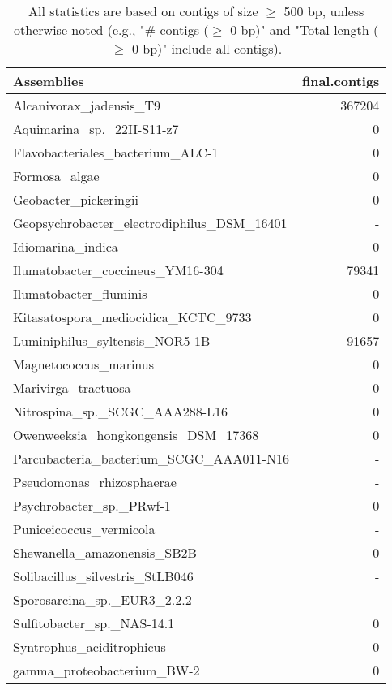 \documentclass[12pt,a4paper]{article}
\begin{document}
\begin{table}[ht]
\begin{center}
\caption{All statistics are based on contigs of size $\geq$ 500 bp, unless otherwise noted (e.g., "\# contigs ($\geq$ 0 bp)" and "Total length ($\geq$ 0 bp)" include all contigs).}
\begin{tabular}{|l*{1}{|r}|}
\hline
Assemblies & final.contigs \\ \hline
Alcanivorax\_jadensis\_T9 & 367204 \\ \hline
Aquimarina\_sp.\_22II-S11-z7 & 0 \\ \hline
Flavobacteriales\_bacterium\_ALC-1 & 0 \\ \hline
Formosa\_algae & 0 \\ \hline
Geobacter\_pickeringii & 0 \\ \hline
Geopsychrobacter\_electrodiphilus\_DSM\_16401 & - \\ \hline
Idiomarina\_indica & 0 \\ \hline
Ilumatobacter\_coccineus\_YM16-304 & 79341 \\ \hline
Ilumatobacter\_fluminis & 0 \\ \hline
Kitasatospora\_mediocidica\_KCTC\_9733 & 0 \\ \hline
Luminiphilus\_syltensis\_NOR5-1B & 91657 \\ \hline
Magnetococcus\_marinus & 0 \\ \hline
Marivirga\_tractuosa & 0 \\ \hline
Nitrospina\_sp.\_SCGC\_AAA288-L16 & 0 \\ \hline
Owenweeksia\_hongkongensis\_DSM\_17368 & 0 \\ \hline
Parcubacteria\_bacterium\_SCGC\_AAA011-N16 & - \\ \hline
Pseudomonas\_rhizosphaerae & - \\ \hline
Psychrobacter\_sp.\_PRwf-1 & 0 \\ \hline
Puniceicoccus\_vermicola & - \\ \hline
Shewanella\_amazonensis\_SB2B & 0 \\ \hline
Solibacillus\_silvestris\_StLB046 & - \\ \hline
Sporosarcina\_sp.\_EUR3\_2.2.2 & - \\ \hline
Sulfitobacter\_sp.\_NAS-14.1 & 0 \\ \hline
Syntrophus\_aciditrophicus & 0 \\ \hline
gamma\_proteobacterium\_BW-2 & 0 \\ \hline
\end{tabular}
\end{center}
\end{table}
\end{document}
